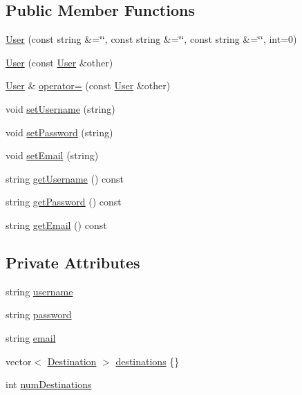 \subsection*{Public Member Functions}
\begin{DoxyCompactItemize}
\item 
\hyperlink{class_user_acefd113882ab5f80ea087401b7f9d0b4}{User} (const string \&=\char`\"{}\char`\"{}, const string \&=\char`\"{}\char`\"{}, const string \&=\char`\"{}\char`\"{}, int=0)
\item 
\hyperlink{class_user_aad23b10cdefd26d6ca2ca981e9f9c973}{User} (const \hyperlink{class_user}{User} \&other)
\item 
\hyperlink{class_user}{User} \& \hyperlink{class_user_a00fe82353b0ee8cf6abb1088d36e125b}{operator=} (const \hyperlink{class_user}{User} \&other)
\item 
void \hyperlink{class_user_a453323a9766e086f1967a96d79fc8b76}{set\+Username} (string)
\item 
void \hyperlink{class_user_ab8d3c965902b378fc3472b388a97d56d}{set\+Password} (string)
\item 
void \hyperlink{class_user_a79486f90c900c5dfc272f0ad9a204c95}{set\+Email} (string)
\item 
string \hyperlink{class_user_a82e034043e04b2d750c654c8b2f2ce78}{get\+Username} () const
\item 
string \hyperlink{class_user_a33429bdd1253091697a9c5c5e1448bee}{get\+Password} () const
\item 
string \hyperlink{class_user_a4c647e583bd964f40f687776a0d185dc}{get\+Email} () const
\end{DoxyCompactItemize}
\subsection*{Private Attributes}
\begin{DoxyCompactItemize}
\item 
string \hyperlink{class_user_ad1f3276105af51c570f5434e516ee30f}{username}
\item 
string \hyperlink{class_user_ab537b9a55bc7d7fcafcdf8e53d085e67}{password}
\item 
string \hyperlink{class_user_a2d678acd22b533660b4b7d8404961f14}{email}
\item 
vector$<$ \hyperlink{class_destination}{Destination} $>$ \hyperlink{class_user_ab150b363696aa72f8bec27714961c37e}{destinations} \{\}
\item 
int \hyperlink{class_user_a86e12420fb10daa28b68ee2f0c3caa00}{num\+Destinations}
\end{DoxyCompactItemize}
